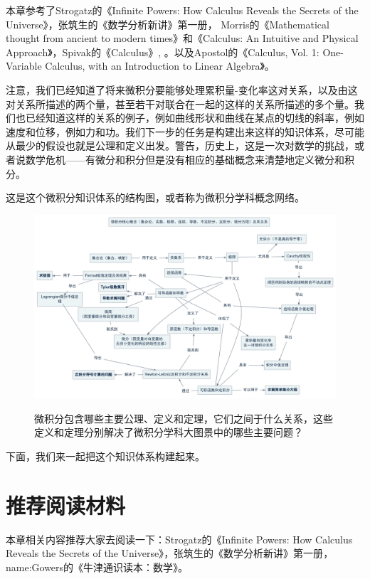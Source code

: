 \documentclass{ctexbook}
\newcommand{\note}[1]{{\color{blue}{#1}}}
\newcommand{\FigLabel}[1]{\label{#1}}
\begin{document}
本章参考了Strogatz的《Infinite Powers: How Calculus Reveals the Secrets of the Universe》\cite{Strogatz:InfinitePowers}，张筑生的《数学分析新讲》第一册\cite{Zhang:Calculus}， Morris的《Mathematical thought from ancient to modern times》\cite{Kline:Thought}和《Calculus: An Intuitive and Physical Approach》\cite{Kline:Calculus}，Spivak的《Calculus》\cite{Spivak:Calculus},
\cite{Apostol:Calculus}。以及Apostol的《Calculus, Vol. 1: One-Variable Calculus, with an Introduction to Linear Algebra》。

注意，我们已经知道了将来微积分要能够处理累积量-变化率这对关系，以及由这对关系所描述的两个量，甚至若干对联合在一起的这样的关系所描述的多个量。我们也已经知道这样的关系的例子，例如曲线形状和曲线在某点的切线的斜率，例如速度和位移，例如力和功。我们下一步的任务是构建出来这样的知识体系，尽可能从最少的假设也就是公理和定义出发。警告，历史上，这是一次对数学的挑战，或者说数学危机——有微分和积分但是没有相应的基础概念来清楚地定义微分和积分。

这是这个微积分知识体系的结构图，或者称为微积分学科概念网络。
\begin{figure}
\includegraphics[width=13cm]{figure/CaculusContents}
\caption[微积分学科概念网络]{微积分包含哪些主要公理、定义和定理，它们之间于什么关系，这些定义和定理分别解决了微积分学科大图景中的哪些主要问题？}\note{可以再调整一下布局，美观一点}
\FigLabel{Fig:CaculusContents}
\end{figure}
下面，我们来一起把这个知识体系构建起来。


\section{推荐阅读材料}
本章相关内容推荐大家去阅读一下：Strogatz的《Infinite Powers: How Calculus Reveals the Secrets of the Universe》\cite{Strogatz:InfinitePowers}，张筑生的《数学分析新讲》第一册\cite{Zhang:Calculus}，\gls{name:Gowers}的《牛津通识读本：数学》。
\end{document}
